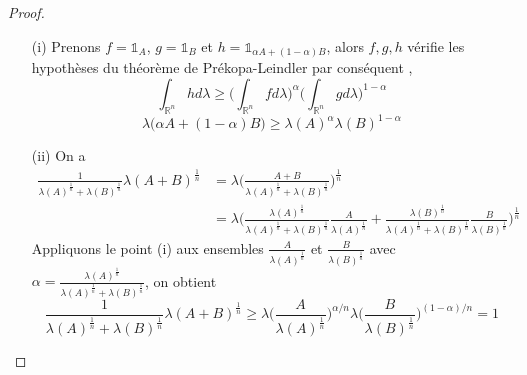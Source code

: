 \documentclass[12pt]{article}
\theoremstyle{definition}
\begin{document}
\begin{proof}
	\begin{enumerate}
		\item[(i)] Prenons $f=\mathbb{1}_A$, $g=\mathbb{1}_B$ et $h=\mathbb{1}_{\alpha A+(1-\alpha)B}$, alors $f,g,h$ vérifie les hypothèses du théorème de Prékopa-Leindler par conséquent ,
		\begin{equation*}
		\int_{\mathbb{R}^n}hd\lambda \geq \Big(\int_{\mathbb{R}^n}fd\lambda\Big)^{\alpha} \Big(\int_{\mathbb{R}^n}gd\lambda\Big)^{1-\alpha}
		\end{equation*}
		\begin{equation*}
		\lambda\big(\alpha A+(1-\alpha)B\big) \geq \lambda(A)^{\alpha} \lambda(B)^{1-\alpha}
		\end{equation*}
		\item[(ii)] On a
		\begin{align*}
		\frac{1}{\lambda(A)^{\frac{1}{n}}+\lambda(B)^{\frac{1}{n}}}\lambda(A+B)^{\frac{1}{n}}&=\lambda\Big(\frac{A+B}{\lambda(A)^{\frac{1}{n}}+\lambda(B)^{\frac{1}{n}}}\Big)^{\frac{1}{n}}\\
		&=\lambda\Big(\frac{\lambda(A)^\frac{1}{n}}{\lambda(A)^{\frac{1}{n}}+\lambda(B)^{\frac{1}{n}}}\frac{A}{\lambda(A)^\frac{1}{n}}+\frac{\lambda(B)^\frac{1}{n}}{\lambda(A)^{\frac{1}{n}}+\lambda(B)^{\frac{1}{n}}}\frac{B}{\lambda(B)^\frac{1}{n}}\Big)^\frac{1}{n}
		\end{align*}
		Appliquons le point (i) aux ensembles $\frac{A}{\lambda(A)^{\frac{1}{n}}}$ et $\frac{B}{\lambda(B)^{\frac{1}{n}}}$ avec $\alpha = \frac{\lambda(A)^\frac{1}{n}}{\lambda(A)^{\frac{1}{n}}+\lambda(B)^{\frac{1}{n}}}$, on obtient 
		\begin{equation*}
		\frac{1}{\lambda(A)^{\frac{1}{n}}+\lambda(B)^{\frac{1}{n}}}\lambda(A+B)^{\frac{1}{n}}\geq \lambda\big(\frac{A}{\lambda(A)^\frac{1}{n}}\big)^{\alpha/n} \lambda\big(\frac{B}{\lambda(B)^\frac{1}{n}}\big)^{(1-\alpha)/n}=1
		\end{equation*}
	\end{enumerate}
\end{proof}
\end{document}
